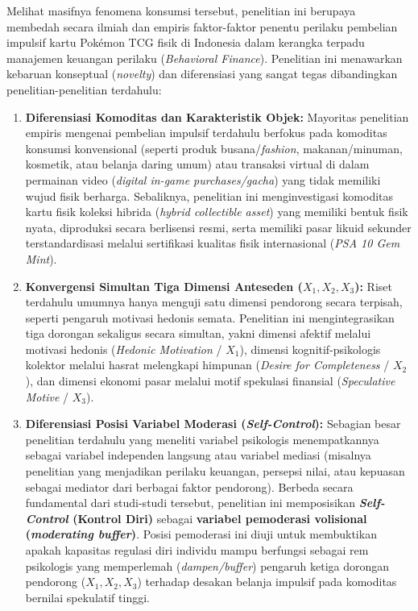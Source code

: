 \documentclass[12pt,a4paper]{article}
\numberwithin{equation}{section}
\numberwithin{table}{section}
\numberwithin{figure}{section}
\begin{document}
Melihat masifnya fenomena konsumsi tersebut, penelitian ini berupaya membedah secara ilmiah dan empiris faktor-faktor penentu perilaku pembelian impulsif kartu Pok\'emon TCG fisik di Indonesia dalam kerangka terpadu manajemen keuangan perilaku (\emph{Behavioral Finance}). Penelitian ini menawarkan kebaruan konseptual (\emph{novelty}) dan diferensiasi yang sangat tegas dibandingkan penelitian-penelitian terdahulu:
\begin{enumerate}
  \item \textbf{Diferensiasi Komoditas dan Karakteristik Objek:} Mayoritas penelitian empiris mengenai pembelian impulsif terdahulu berfokus pada komoditas konsumsi konvensional (seperti produk busana/\emph{fashion}, makanan/minuman, kosmetik, atau belanja daring umum) atau transaksi virtual di dalam permainan video (\emph{digital in-game purchases/gacha}) yang tidak memiliki wujud fisik berharga. Sebaliknya, penelitian ini menginvestigasi komoditas kartu fisik koleksi hibrida (\emph{hybrid collectible asset}) yang memiliki bentuk fisik nyata, diproduksi secara berlisensi resmi, serta memiliki pasar likuid sekunder terstandardisasi melalui sertifikasi kualitas fisik internasional (\emph{PSA 10 Gem Mint}).
  \item \textbf{Konvergensi Simultan Tiga Dimensi Anteseden ($X_1, X_2, X_3$):} Riset terdahulu umumnya hanya menguji satu dimensi pendorong secara terpisah, seperti pengaruh motivasi hedonis semata. Penelitian ini mengintegrasikan tiga dorongan sekaligus secara simultan, yakni dimensi afektif melalui motivasi hedonis (\emph{Hedonic Motivation} / $X_1$), dimensi kognitif-psikologis kolektor melalui hasrat melengkapi himpunan (\emph{Desire for Completeness} / $X_2$), dan dimensi ekonomi pasar melalui motif spekulasi finansial (\emph{Speculative Motive} / $X_3$).
  \item \textbf{Diferensiasi Posisi Variabel Moderasi (\emph{Self-Control}):} Sebagian besar penelitian terdahulu yang meneliti variabel psikologis menempatkannya sebagai variabel independen langsung atau variabel mediasi (misalnya penelitian yang menjadikan perilaku keuangan, persepsi nilai, atau kepuasan sebagai mediator dari berbagai faktor pendorong). Berbeda secara fundamental dari studi-studi tersebut, penelitian ini memposisikan \textbf{\emph{Self-Control} (Kontrol Diri)} sebagai \textbf{variabel pemoderasi volisional (\emph{moderating buffer})}. Posisi pemoderasi ini diuji untuk membuktikan apakah kapasitas regulasi diri individu mampu berfungsi sebagai rem psikologis yang memperlemah (\emph{dampen/buffer}) pengaruh ketiga dorongan pendorong ($X_1, X_2, X_3$) terhadap desakan belanja impulsif pada komoditas bernilai spekulatif tinggi.
\end{enumerate}
\end{document}
